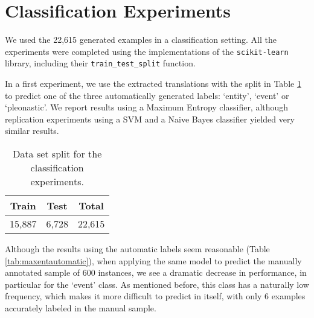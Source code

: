 \documentclass[10pt, a4paper]{article}
\begin{document}
\section{Classification Experiments}\label{sec:experiments}

We used the 22,615 generated examples in a classification setting. All the 
experiments were completed using the implementations of the 
\texttt{scikit-learn} library, including their \texttt{train\_test\_split} 
function. 

In a first experiment, we use the extracted translations with the split in Table 
\ref{tab:split} to predict one of the three automatically generated labels: 
`entity', `event' or `pleonastic'. We report results using a Maximum Entropy 
classifier, although replication experiments using a SVM and a Naive Bayes 
classifier yielded very similar results. 


\begin{table}[h!]\centering
\begin{tabular}{ccc}
\toprule
\textbf{Train} & \textbf{Test} & \textbf{Total} \\
\midrule
15,887 & 6,728 & 22,615 \\
\bottomrule
\end{tabular}
\caption{Data set split for the classification experiments.}\label{tab:split}
\end{table}

Although the results using the automatic labels seem reasonable (Table  
\ref{tab:maxentautomatic}), when applying the same model to predict the manually 
annotated sample of 600 instances, we see a dramatic decrease in performance, in 
particular for the `event' class. As mentioned before, this class has a naturally 
low frequency, which makes it more 
difficult to predict in itself, with only 6 examples accurately labeled in the manual sample. 
\end{document}
